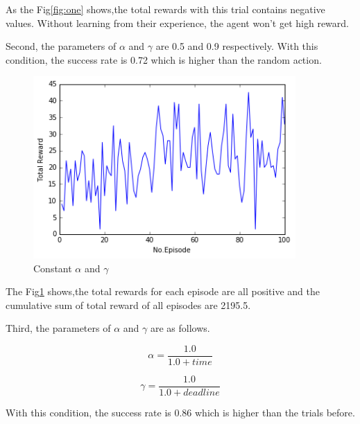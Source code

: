 \documentclass[a4paper,11pt]{article}
\begin{document}
As the Fig\ref{fig:one} shows,the total rewards with this trial contains negative values.
Without learning from their experience, the agent won't get high reward.



Second, the parameters of $\alpha$ and $\gamma$ are 0.5 and 0.9 respectively.
With this condition, the success rate is 0.72 which is higher than the random action.

\begin{figure}[H]
\begin{center}
\includegraphics[width=100mm]{graph/constant.jpg}
\end{center}
\caption{Constant $\alpha$ and $\gamma$}
\label{fig:two}
\end{figure}

The Fig\ref{fig:two} shows,the total rewards for each episode are all positive and the cumulative sum of total reward of all episodes are 2195.5.




Third, the parameters of $\alpha$ and $\gamma$ are as follows.

\begin{equation}
	\alpha=\frac{1.0}{1.0+time}
\end{equation}

\begin{equation}
	\gamma=\frac{1.0}{1.0+deadline}
\end{equation}

With this condition, the success rate is 0.86 which is higher than the trials before.
\end{document}
